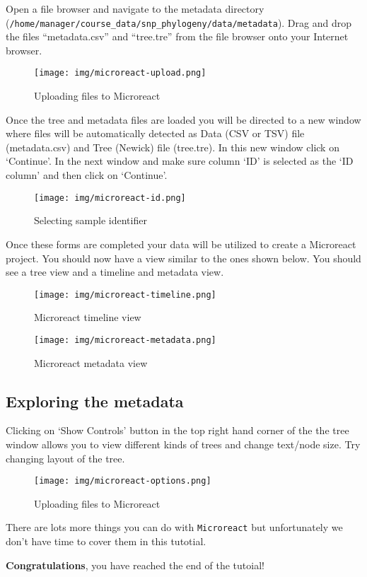 \documentclass[11pt]{article}
\begin{document}
    Open a file browser and navigate to the metadata directory
(\texttt{/home/manager/course\_data/snp\_phylogeny/data/metadata}). Drag
and drop the files ``metadata.csv'' and ``tree.tre'' from the file
browser onto your Internet browser.

    \begin{figure}
\centering
\texttt{[image: img/microreact-upload.png]}
\caption{Uploading files to Microreact}
\end{figure}

    Once the tree and metadata files are loaded you will be directed to a
new window where files will be automatically detected as Data (CSV or
TSV) file (metadata.csv) and Tree (Newick) file (tree.tre). In this new
window click on `Continue'. In the next window and make sure column `ID'
is selected as the `ID column' and then click on `Continue'.

    \begin{figure}
\centering
\texttt{[image: img/microreact-id.png]}
\caption{Selecting sample identifier}
\end{figure}

    Once these forms are completed your data will be utilized to create a
Microreact project. You should now have a view similar to the ones shown
below. You should see a tree view and a timeline and metadata view.

    \begin{figure}
\centering
\texttt{[image: img/microreact-timeline.png]}
\caption{Microreact timeline view}
\end{figure}

    \begin{figure}
\centering
\texttt{[image: img/microreact-metadata.png]}
\caption{Microreact metadata view}
\end{figure}

    \hypertarget{exploring-the-metadata}{%
\subsection{Exploring the metadata}\label{exploring-the-metadata}}

Clicking on `Show Controls' button in the top right hand corner of the
the tree window allows you to view different kinds of trees and change
text/node size. Try changing layout of the tree.

    \begin{figure}
\centering
\texttt{[image: img/microreact-options.png]}
\caption{Uploading files to Microreact}
\end{figure}

    There are lots more things you can do with \texttt{Microreact} but
unfortunately we don't have time to cover them in this tutotial.

\textbf{Congratulations}, you have reached the end of the tutoial!


\end{document}
